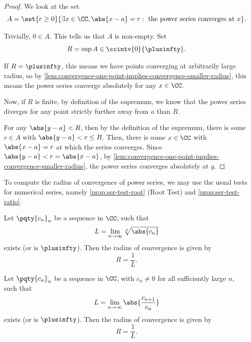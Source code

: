 \begin{proof}
    We look at the set
    \[
        A = \set{r \geq 0}{\exists x \in \CC, \abs{x - a} = r: \text{ the power series converges at }x}.
    \]

    Trivially, \(0 \in A\). This tells us that \(A\) is non-empty. Set
    \[
        R = \sup A \in \ccintv{0}{\plusinfty}.
    \]

    If \(R = \plusinfty\), this means we have points converging at arbitrarily large radius, so by \autoref{lem:convergence-one-point-implies-convergence-smaller-radius}, this means the power series converge absolutely for any \(x \in \CC\).

    Now, if \(R\) is finite, by definition of the supremum, we know that the power series diverges for any point strictly further away from \(a\) than \(R\).
    
    For any \(\abs{y - a} < R\), then by the definition of the supremum, there is some \(r \in A\) with \(\abs{y - a} < r \leq R\). Then, there is some \(x \in \CC\) with \(\abs{x - a} = r\) at which the series converges. Since \(\abs{y - a} < r = \abs{x - a}\), by \autoref{lem:convergence-one-point-implies-convergence-smaller-radius}, the power series converges absolutely at \(y\).
\end{proof}

To compute the radius of convergence of power series, we may use the usual tests for numerical series, namely \autoref{prop:ser-test-root} (Root Test) and \autoref{prop:ser-test-ratio}.

\begin{proposition}
    \label{prop:power-series-test-root}%
    Let \(\pqty{c_n}_n\) be a sequence in \(\CC\), such that
    \[
        L = \lim_{n \to \infty} \sqrt[n]{\abs{c_n}}
    \]
    exists (or is \(\plusinfty\)). Then the radius of convergence is given by
    \[
        R = \frac{1}{L}.
    \]
\end{proposition}

\begin{proposition}
    \label{prop:power-series-test-ratio}%
    Let \(\pqty{c_n}_n\) be a sequence in \(\CC\), with \(c_n \neq 0\) for all sufficiently large \(n\), such that
    \[
        L = \lim_{n \to \infty} \abs{\frac{c_{n + 1}}{c_n}}
    \]
    exists (or is \(\plusinfty\)). Then the radius of convergence is given by
    \[
        R = \frac{1}{L}.
    \]
\end{proposition}


